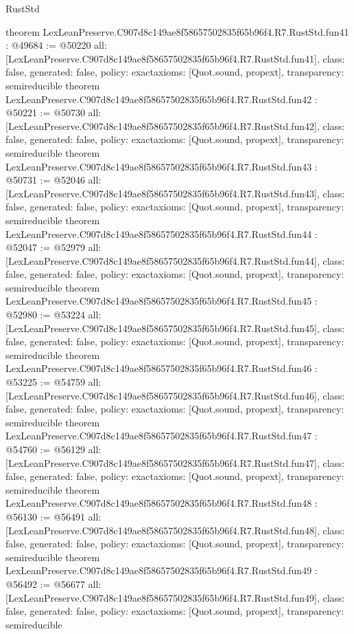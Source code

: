 \begin{lexlean}{RustStd}
\begin{coremodule}
{}
theorem LexLeanPreserve.C907d8c149ae8f58657502835f65b96f4.R7.RustStd.fun41 : @49684 := @50220 {
  all: [LexLeanPreserve.C907d8c149ae8f58657502835f65b96f4.R7.RustStd.fun41],
  class: false,
  generated: false,
  policy: exact{axioms: [Quot.sound, propext]},
  transparency: semireducible
}
theorem LexLeanPreserve.C907d8c149ae8f58657502835f65b96f4.R7.RustStd.fun42 : @50221 := @50730 {
  all: [LexLeanPreserve.C907d8c149ae8f58657502835f65b96f4.R7.RustStd.fun42],
  class: false,
  generated: false,
  policy: exact{axioms: [Quot.sound, propext]},
  transparency: semireducible
}
theorem LexLeanPreserve.C907d8c149ae8f58657502835f65b96f4.R7.RustStd.fun43 : @50731 := @52046 {
  all: [LexLeanPreserve.C907d8c149ae8f58657502835f65b96f4.R7.RustStd.fun43],
  class: false,
  generated: false,
  policy: exact{axioms: [Quot.sound, propext]},
  transparency: semireducible
}
theorem LexLeanPreserve.C907d8c149ae8f58657502835f65b96f4.R7.RustStd.fun44 : @52047 := @52979 {
  all: [LexLeanPreserve.C907d8c149ae8f58657502835f65b96f4.R7.RustStd.fun44],
  class: false,
  generated: false,
  policy: exact{axioms: [Quot.sound, propext]},
  transparency: semireducible
}
theorem LexLeanPreserve.C907d8c149ae8f58657502835f65b96f4.R7.RustStd.fun45 : @52980 := @53224 {
  all: [LexLeanPreserve.C907d8c149ae8f58657502835f65b96f4.R7.RustStd.fun45],
  class: false,
  generated: false,
  policy: exact{axioms: [Quot.sound, propext]},
  transparency: semireducible
}
theorem LexLeanPreserve.C907d8c149ae8f58657502835f65b96f4.R7.RustStd.fun46 : @53225 := @54759 {
  all: [LexLeanPreserve.C907d8c149ae8f58657502835f65b96f4.R7.RustStd.fun46],
  class: false,
  generated: false,
  policy: exact{axioms: [Quot.sound, propext]},
  transparency: semireducible
}
theorem LexLeanPreserve.C907d8c149ae8f58657502835f65b96f4.R7.RustStd.fun47 : @54760 := @56129 {
  all: [LexLeanPreserve.C907d8c149ae8f58657502835f65b96f4.R7.RustStd.fun47],
  class: false,
  generated: false,
  policy: exact{axioms: [Quot.sound, propext]},
  transparency: semireducible
}
theorem LexLeanPreserve.C907d8c149ae8f58657502835f65b96f4.R7.RustStd.fun48 : @56130 := @56491 {
  all: [LexLeanPreserve.C907d8c149ae8f58657502835f65b96f4.R7.RustStd.fun48],
  class: false,
  generated: false,
  policy: exact{axioms: [Quot.sound, propext]},
  transparency: semireducible
}
theorem LexLeanPreserve.C907d8c149ae8f58657502835f65b96f4.R7.RustStd.fun49 : @56492 := @56677 {
  all: [LexLeanPreserve.C907d8c149ae8f58657502835f65b96f4.R7.RustStd.fun49],
  class: false,
  generated: false,
  policy: exact{axioms: [Quot.sound, propext]},
  transparency: semireducible
}
\end{coremodule}
\end{lexlean}
